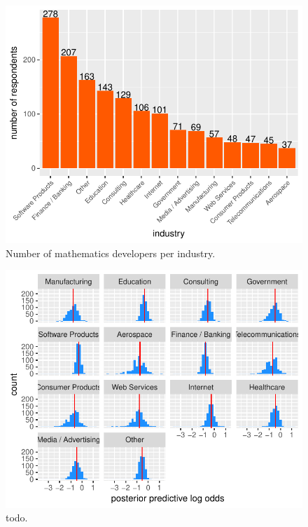 \documentclass{article}
\begin{document}
\begin{figure}[H]
\centering
\includegraphics{report-027}
\caption{Number of mathematics developers per industry.}\label{fig_7}
\end{figure}





\begin{figure}[H]
\centering
\includegraphics{report-032}
\caption{todo.}\label{fig_8}
\end{figure}
\end{document}
